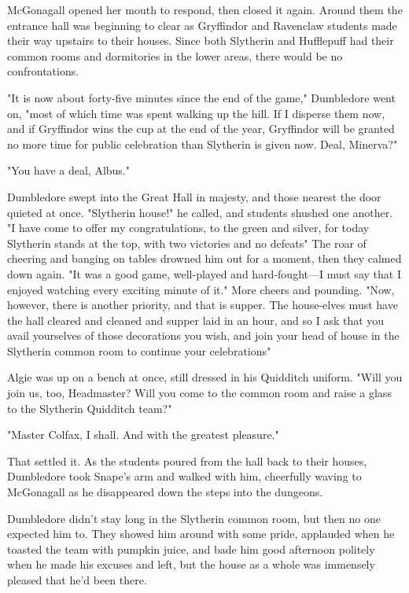 McGonagall opened her mouth to respond, then closed it again. Around them the entrance hall was beginning to clear as Gryffindor and Ravenclaw students made their way upstairs to their houses. Since both Slytherin and Hufflepuff had their common rooms and dormitories in the lower areas, there would be no confrontations.

"It is now about forty-five minutes since the end of the game," Dumbledore went on, "most of which time was spent walking up the hill. If I disperse them now, and if Gryffindor wins the cup at the end of the year, Gryffindor will be granted no more time for public celebration than Slytherin is given now. Deal, Minerva?"

"You have a deal, Albus."

Dumbledore swept into the Great Hall in majesty, and those nearest the door quieted at once. "Slytherin house!" he called, and students shushed one another. "I have come to offer my congratulations, to the green and silver, for today Slytherin stands at the top, with two victories and no defeats{\el}" The roar of cheering and banging on tables drowned him out for a moment, then they calmed down again. "It was a good game, well-played and hard-fought—I must say that I enjoyed watching every exciting minute of it." More cheers and pounding. "Now, however, there is another priority, and that is supper. The house-elves must have the hall cleared and cleaned and supper laid in an hour, and so I ask that you avail yourselves of those decorations you wish, and join your head of house in the Slytherin common room to continue your celebrations{\el}"

Algie was up on a bench at once, still dressed in his Quidditch uniform. "Will you join us, too, Headmaster? Will you come to the common room and raise a glass to the Slytherin Quidditch team?"

"Master Colfax, I shall. And with the greatest pleasure."

That settled it. As the students poured from the hall back to their houses, Dumbledore took Snape's arm and walked with him, cheerfully waving to McGonagall as he disappeared down the steps into the dungeons.

Dumbledore didn't stay long in the Slytherin common room, but then no one expected him to. They showed him around with some pride, applauded when he toasted the team with pumpkin juice, and bade him good afternoon politely when he made his excuses and left, but the house as a whole was immensely pleased that he'd been there.

